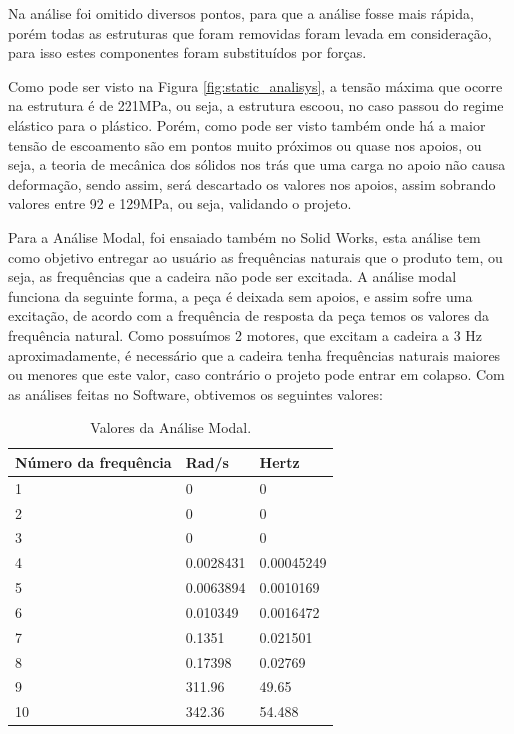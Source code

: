 Na análise foi omitido diversos pontos, para que a análise fosse mais rápida,
porém todas as estruturas que foram removidas foram levada em consideração,
para isso estes componentes foram substituídos por forças.

Como pode ser visto na Figura \ref{fig:static_analisys}, a tensão máxima que ocorre na estrutura é de
221MPa, ou seja, a estrutura escoou, no caso passou do regime elástico para o
plástico. Porém, como pode ser visto também onde há a maior tensão de escoamento
são em pontos muito próximos ou quase nos apoios, ou seja, a teoria de mecânica
dos sólidos nos trás que uma carga no apoio não causa deformação, sendo assim,
será descartado os valores nos apoios, assim sobrando valores entre 92 e
129MPa, ou seja, validando o projeto.

Para a Análise Modal, foi ensaiado também no Solid Works, esta análise tem como
objetivo entregar ao usuário as frequências naturais que o produto tem,
ou seja, as frequências que a cadeira não pode ser excitada. A análise modal
funciona da seguinte forma, a peça é deixada sem apoios, e assim sofre uma
excitação, de acordo com a frequência de resposta da peça temos os valores da
frequência natural. Como possuímos 2 motores, que excitam a cadeira a 3 Hz
aproximadamente, é necessário que a cadeira tenha frequências naturais maiores
ou menores que este valor, caso contrário o projeto pode entrar em colapso.
Com as análises feitas no Software, obtivemos os seguintes valores:

\begin{table}[!htbp]
    \centering
    \caption{Valores da Análise Modal.}
    \label{tab:modal_analisys_values}
        \begin{tabular}{|l|l|l|}
            \hline
            \textbf{Número da frequência} & \textbf{Rad/s} & \textbf{Hertz} \\
            \hline
            1 & 0 & 0 \\
            \hline
            2 & 0 & 0 \\
            \hline
            3 & 0 & 0 \\
            \hline
            4 & 0.0028431 & 0.00045249 \\
            \hline
            5 & 0.0063894 & 0.0010169 \\
            \hline
            6 & 0.010349 & 0.0016472 \\
            \hline
            7 & 0.1351 & 0.021501 \\
            \hline
            8 & 0.17398 & 0.02769 \\
            \hline
            9 & 311.96 & 49.65 \\
            \hline
            10 & 342.36 & 54.488 \\
            \hline

        \end{tabular}
\end{table}

